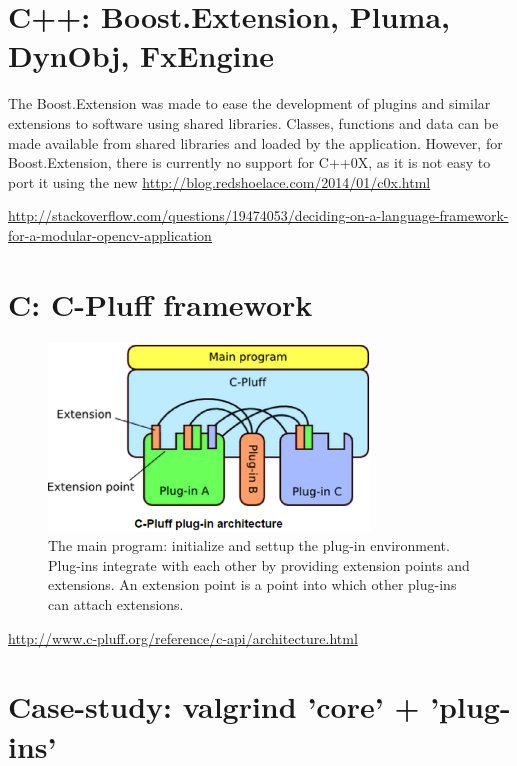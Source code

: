 \section{C++: Boost.Extension, Pluma, DynObj, FxEngine}

The Boost.Extension was made to ease the development of plugins and similar
extensions to software using shared libraries. Classes, functions and data can be made available from shared libraries and loaded by the application.
However, for Boost.Extension, there is currently no support for C++0X, as it is
not easy to port it using the new 
\url{http://blog.redshoelace.com/2014/01/c0x.html}

\url{http://stackoverflow.com/questions/19474053/deciding-on-a-language-framework-for-a-modular-opencv-application}

\section{C: C-Pluff framework}


\begin{figure}[hbt]
  \centerline{\includegraphics[height=5cm,
    angle=0]{./images/C-pluff_framework.eps}}
\caption{The main program: initialize and settup the plug-in environment.
Plug-ins integrate with each other by providing extension points and extensions.
An extension point is a point into which other plug-ins can attach extensions.}
\label{fig:C-pluff_framework}
\end{figure}

\url{http://www.c-pluff.org/reference/c-api/architecture.html}


\section{Case-study: valgrind 'core' + 'plug-ins'}


